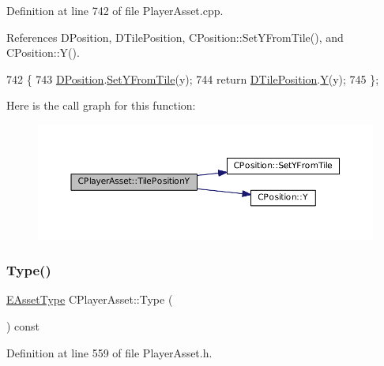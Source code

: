 Definition at line 742 of file Player\+Asset.\+cpp.



References D\+Position, D\+Tile\+Position, C\+Position\+::\+Set\+Y\+From\+Tile(), and C\+Position\+::\+Y().


\begin{DoxyCode}
742                                     \{
743     \hyperlink{classCPlayerAsset_aa9f53c009b181c7c5647c6b03776a04c}{DPosition}.\hyperlink{classCPosition_a4be1caa5ce58297e9d371f6bc1db32d9}{SetYFromTile}(y);
744     \textcolor{keywordflow}{return} \hyperlink{classCPlayerAsset_a5b59a9d3b7db8c7fa194b80dafb96186}{DTilePosition}.\hyperlink{classCPosition_a1aa8a30e2f08dda1f797736ba8c13a87}{Y}(y);
745 \};
\end{DoxyCode}
Here is the call graph for this function\+:\nopagebreak
\begin{figure}[H]
\begin{center}
\leavevmode
\includegraphics[width=350pt]{classCPlayerAsset_ad3ce562cbd27e2c35abe968a7ff19cd6_cgraph}
\end{center}
\end{figure}
\hypertarget{classCPlayerAsset_a6d6aeea4e8b02e0f239bac95db6d9e0a}{}\label{classCPlayerAsset_a6d6aeea4e8b02e0f239bac95db6d9e0a} 
\subsubsection{\texorpdfstring{Type()}{Type()}}
{\footnotesize\ttfamily \hyperlink{GameDataTypes_8h_a5600d4fc433b83300308921974477fec}{E\+Asset\+Type} C\+Player\+Asset\+::\+Type (\begin{DoxyParamCaption}{ }\end{DoxyParamCaption}) const\hspace{0.3cm}{\ttfamily [inline]}}



Definition at line 559 of file Player\+Asset.\+h.



